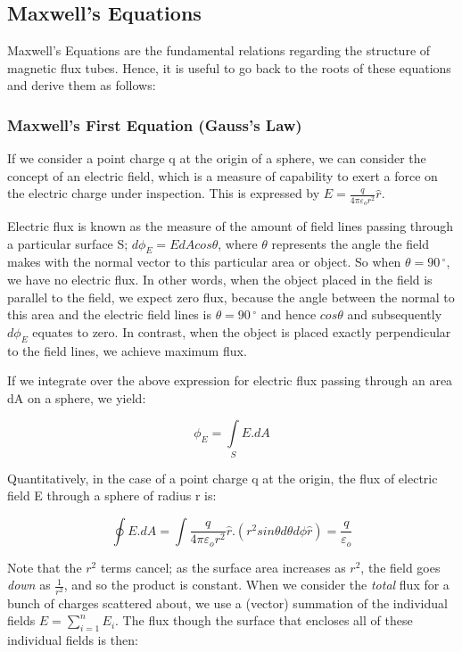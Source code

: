 \documentclass[a4paper,12pt]{article}
\begin{document}
\subsection{Maxwell's Equations}

Maxwell's Equations are the fundamental relations regarding the structure of magnetic flux tubes. Hence, it is useful to go back to the roots of these equations and derive them as follows:

\subsubsection{Maxwell's First Equation (Gauss's Law)}

If we consider a point charge q at the origin of a sphere, we can consider the concept of an electric field, which is a measure of capability to exert a force on the electric charge under inspection. This is expressed by $E=\frac{q}{4\pi\varepsilon_o r^2}\hat{r}$.

Electric flux is known as the measure of the amount of field lines passing through a particular surface S; $d\phi_E=EdAcos\theta$, where $\theta$ represents the angle the field makes with the normal vector to this particular area or object. So when $\theta=90\,^{\circ}$, we have no electric flux. In other words, when the object placed in the field is parallel to the field, we expect zero flux, because the angle between the normal to this area and the electric field lines is $\theta=90\,^{\circ}$ and hence $cos\theta$ and subsequently $d\phi_E$ equates to zero. In contrast, when the object is placed exactly perpendicular to the field lines, we achieve maximum flux. 

If we integrate over the above expression for electric flux passing through an area dA on a sphere, we yield:

\[\phi_E=\int\limits_S E.dA\]



Quantitatively, in the case of a point charge q at the origin, the flux of electric field E through a sphere of radius r is:

\[\oint E.dA = \int \frac{q}{4\pi\varepsilon_o r^2}\hat{r}.(r^2sin\theta d \theta d\phi\hat{r})=\frac{q}{\varepsilon_o}\]


Note that the $r^2$ terms cancel; as the surface area increases as $r^2$, the field goes \emph{down} as $\frac{1}{r^2}$, and so the product is constant. When we consider the \emph{total} flux for a bunch of charges scattered about, we use a (vector) summation of the individual fields $E=\sum\limits_{i=1}^n E_i$. The flux though the surface that encloses all of these individual fields is then:
\end{document}
